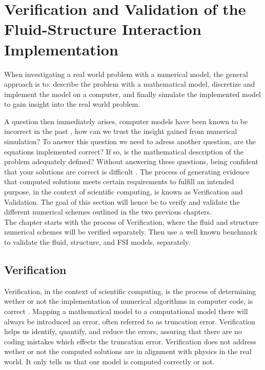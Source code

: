 \chapter{Verification and Validation of the Fluid-Structure Interaction Implementation}\label{chap:VV}
When investigating a real world problem with a numerical model, the general approach is to: describe the problem with a mathematical model, discretize and implement the model on a computer, and finally simulate the implemented model to gain insight into the real world problem.

A question then immediately arises, computer models have been known to be incorrect in the past \cite{oberkampf2008verification}, how can we trust the insight gained from numerical simulation? 
To answer this question we need to adress another question, are the equations implemented correct? If so, is the mathematical description of the problem adequately defined? 
Without answering these questions, being confident that your solutions are correct is difficult \cite{oberkampf2008verification}. The process of generating evidence that computed solutions meets certain requirements to fulfill an intended purpose, in the context of scientific computing, is known as Verification and Validation. The goal of this section will hence be to verify and validate the different numerical schemes outlined in the two previous chapters.  \\

The chapter starts with the process of Verification, where the fluid and structure numerical schemes will be verified separately. Then use a well known benchmark to validate the fluid, structure, and FSI models, separately. \newline

\section{Verification}
Verification, in the context of scientific computing, is the process of determining wether or not the implementation of numerical algorithms in computer code, is correct \cite{Oberkampf2010}.
Mapping a mathematical model to a computational model there will always be introduced an error, often referred to as truncation error. Verification helps us identify, quantify, and reduce the errors, assuring that there are no coding mistakes which effects the truncation error. Verification does not address wether or not the computed solutions are in alignment with physics in the real world. It only tells us that our model is computed correctly or not. \newline

